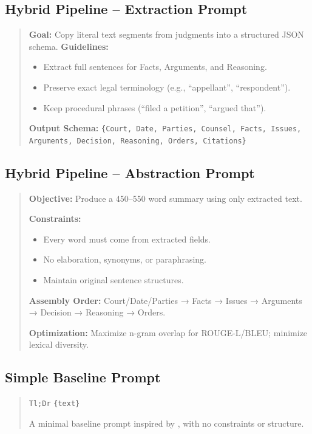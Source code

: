 \documentclass[sigconf]{acmart}
\begin{document}
\subsection{Hybrid Pipeline – Extraction Prompt}
\begin{quote}\small
\textbf{Goal:} Copy literal text segments from judgments into a structured JSON schema.  
\textbf{Guidelines:}  
\begin{itemize}\setlength\itemsep{1pt}
  \item Extract full sentences for Facts, Arguments, and Reasoning.  
  \item Preserve exact legal terminology (e.g., \enquote{appellant}, \enquote{respondent}).  
  \item Keep procedural phrases (\enquote{filed a petition}, \enquote{argued that}).  
\end{itemize}

\textbf{Output Schema:}  
\texttt{\{Court, Date, Parties, Counsel, Facts, Issues, Arguments, Decision, Reasoning, Orders, Citations\}}
\end{quote}

\subsection{Hybrid Pipeline – Abstraction Prompt}
\begin{quote}\small
\textbf{Objective:} Produce a 450–550 word summary using only extracted text.  

\textbf{Constraints:}  
\begin{itemize}\setlength\itemsep{1pt}
  \item Every word must come from extracted fields.  
  \item No elaboration, synonyms, or paraphrasing.  
  \item Maintain original sentence structures.  
\end{itemize}

\textbf{Assembly Order:}  
Court/Date/Parties → Facts → Issues → Arguments → Decision → Reasoning → Orders.  

\textbf{Optimization:}  
Maximize n-gram overlap for ROUGE-L/BLEU; minimize lexical diversity.  
\end{quote}

\subsection{Simple Baseline Prompt}
\begin{quote}\small
\texttt{Tl;Dr}  
\texttt{\{text\}}  

A minimal baseline prompt inspired by \citet{deroy2024applicability}, with no constraints or structure.
\end{quote}
\end{document}
